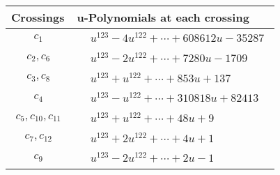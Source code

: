 \documentclass[1p]{elsarticle_modified}
\theoremstyle{definition}
\begin{document}
\begin{tabular}{m{50pt}|m{274pt}}
Crossings & \hspace{64pt}u-Polynomials at each crossing \\
\hline $$\begin{aligned}c_{1}\end{aligned}$$&$\begin{aligned}
&u^{123}-4 u^{122}+\cdots+608612 u-35287
\end{aligned}$\\
\hline $$\begin{aligned}c_{2},c_{6}\end{aligned}$$&$\begin{aligned}
&u^{123}-2 u^{122}+\cdots+7280 u-1709
\end{aligned}$\\
\hline $$\begin{aligned}c_{3},c_{8}\end{aligned}$$&$\begin{aligned}
&u^{123}+u^{122}+\cdots+853 u+137
\end{aligned}$\\
\hline $$\begin{aligned}c_{4}\end{aligned}$$&$\begin{aligned}
&u^{123}- u^{122}+\cdots+310818 u+82413
\end{aligned}$\\
\hline $$\begin{aligned}c_{5},c_{10},c_{11}\end{aligned}$$&$\begin{aligned}
&u^{123}+u^{122}+\cdots+48 u+9
\end{aligned}$\\
\hline $$\begin{aligned}c_{7},c_{12}\end{aligned}$$&$\begin{aligned}
&u^{123}+2 u^{122}+\cdots+4 u+1
\end{aligned}$\\
\hline $$\begin{aligned}c_{9}\end{aligned}$$&$\begin{aligned}
&u^{123}-2 u^{122}+\cdots+2 u-1
\end{aligned}$\\
\hline
\end{tabular}\\~\\
\newpage\renewcommand{\arraystretch}{1}
\end{document}
